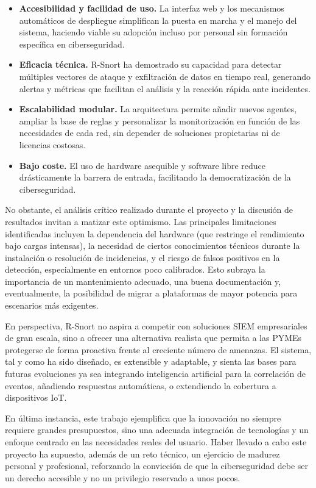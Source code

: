 \documentclass[11pt,a4paper,twoside]{report}
\begin{document}
\begin{itemize}
	\item \textbf{Accesibilidad y facilidad de uso.} La interfaz web y los mecanismos automáticos de despliegue simplifican la puesta en marcha y el manejo del sistema, haciendo viable su adopción incluso por personal sin formación específica en ciberseguridad.
	\item \textbf{Eficacia técnica.} R-Snort ha demostrado su capacidad para detectar múltiples vectores de ataque y exfiltración de datos en tiempo real, generando alertas y métricas que facilitan el análisis y la reacción rápida ante incidentes.
	\item \textbf{Escalabilidad modular.} La arquitectura permite añadir nuevos agentes, ampliar la base de reglas y personalizar la monitorización en función de las necesidades de cada red, sin depender de soluciones propietarias ni de licencias costosas.
	\item \textbf{Bajo coste.} El uso de hardware asequible y software libre reduce drásticamente la barrera de entrada, facilitando la democratización de la ciberseguridad.
\end{itemize}

No obstante, el análisis crítico realizado durante el proyecto y la discusión de resultados invitan a matizar este optimismo. Las principales limitaciones identificadas incluyen la dependencia del hardware (que restringe el rendimiento bajo cargas intensas), la necesidad de ciertos conocimientos técnicos durante la instalación o resolución de incidencias, y el riesgo de falsos positivos en la detección, especialmente en entornos poco calibrados. Esto subraya la importancia de un mantenimiento adecuado, una buena documentación y, eventualmente, la posibilidad de migrar a plataformas de mayor potencia para escenarios más exigentes.\newline

En perspectiva, R-Snort no aspira a competir con soluciones SIEM empresariales de gran escala, sino a ofrecer una alternativa realista que permita a las PYMEs protegerse de forma proactiva frente al creciente número de amenazas. El sistema, tal y como ha sido diseñado, es extensible y adaptable, y sienta las bases para futuras evoluciones ya sea integrando inteligencia artificial para la correlación de eventos, añadiendo respuestas automáticas, o extendiendo la cobertura a dispositivos IoT.\newline

En última instancia, este trabajo ejemplifica que la innovación no siempre requiere grandes presupuestos, sino una adecuada integración de tecnologías y un enfoque centrado en las necesidades reales del usuario. Haber llevado a cabo este proyecto ha supuesto, además de un reto técnico, un ejercicio de madurez personal y profesional, reforzando la convicción de que la ciberseguridad debe ser un derecho accesible y no un privilegio reservado a unos pocos.
\end{document}
